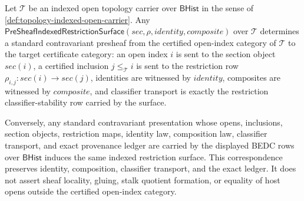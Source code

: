 \begin{theorem}\label{thm:presheaf-indexed-restriction-standard-bridge}
Let $\mathcal{T}$ be an indexed open topology carrier over $\mathsf{BHist}$ in the sense of \autoref{def:topology-indexed-open-carrier}. Any $\mathsf{PreSheafIndexedRestrictionSurface}(sec,\rho,identity,composite)$ over $\mathcal{T}$ determines a standard contravariant presheaf from the certified open-index category of $\mathcal{T}$ to the target certificate category: an open index $i$ is sent to the section object $sec(i)$, a certified inclusion $j\le_{\mathcal{T}} i$ is sent to the restriction row $\rho_{i,j}:sec(i)\to sec(j)$, identities are witnessed by $identity$, composites are witnessed by $composite$, and classifier transport is exactly the restriction classifier-stability row carried by the surface.

Conversely, any standard contravariant presentation whose opens, inclusions, section objects, restriction maps, identity law, composition law, classifier transport, and exact provenance ledger are carried by the displayed BEDC rows over $\mathsf{BHist}$ induces the same indexed restriction surface. This correspondence preserves identity, composition, classifier transport, and the exact ledger. It does not assert sheaf locality, gluing, stalk quotient formation, or equality of host opens outside the certified open-index category.
\end{theorem}

